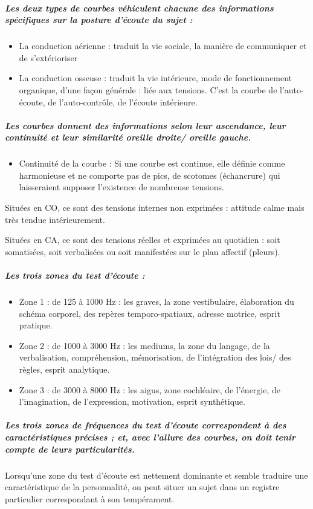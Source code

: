 \subparagraph{Les deux types de courbes véhiculent chacune des informations spécifiques
sur la posture d'écoute du sujet : }
\begin{itemize}
\item La conduction aérienne : traduit la vie sociale, la manière de communiquer
et de s'extérioriser
\item La conduction osseuse : traduit la vie intérieure, mode de fonctionnement
organique, d'une façon générale : liée aux tensions. C'est la courbe
de l\textquoteright auto-écoute, de l\textquoteright auto-contrôle,
de l'écoute intérieure.
\end{itemize}

\subparagraph{Les courbes donnent des informations selon leur ascendance, leur
continuité et leur similarité oreille droite/ oreille gauche.}
\begin{itemize}
\item Continuité de la courbe : Si une courbe est continue, elle définie
comme harmonieuse et ne comporte pas de pics, de scotomes (échancrure)
qui laisseraient
supposer l'existence de nombreuse tensions.
\end{itemize}
Situées en CO, ce sont des tensions internes non exprimées : attitude
calme mais très tendue intérieurement.

Situées en CA, ce sont des tensions réelles et exprimées au quotidien
: soit somatisées, soit verbalisées ou soit manifestées sur le plan
affectif (pleurs).

\subparagraph{Les trois zones du test d'écoute : }
\begin{itemize}
\item Zone 1 : de 125 à 1000 Hz : les graves, la zone vestibulaire, élaboration
du schéma corporel, des repères temporo-spatiaux, adresse motrice,
esprit pratique.
\item Zone 2 : de 1000 à 3000 Hz : les mediums, la zone du langage, de la
verbalisation, compréhension, mémorisation, de l'intégration des lois/
des règles, esprit analytique.
\item Zone 3 : de 3000 à 8000 Hz : les aigus, zone cochléaire, de l'énergie,
de l'imagination, de l'expression, motivation, esprit synthétique.
\end{itemize}

\subparagraph{Les trois zones de fréquences du test d'écoute correspondent à des
caractéristiques précises ; et, avec l'allure des courbes, on doit
tenir compte de leurs particularités.}

Lorsqu'une zone du test d'écoute est nettement dominante et semble
traduire une caractéristique de la personnalité, on peut situer un
sujet dans un registre particulier correspondant à son tempérament.

